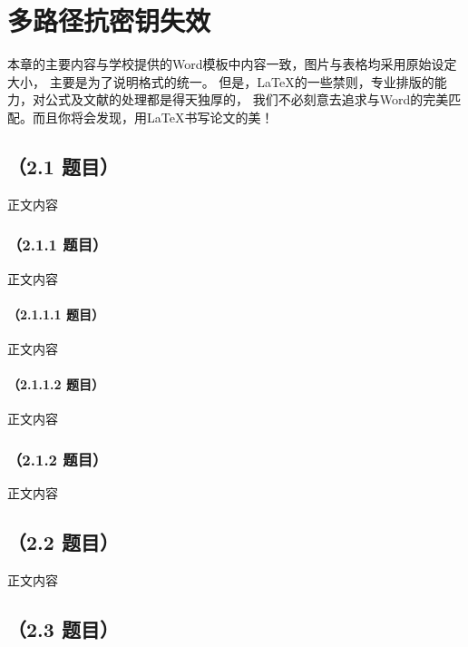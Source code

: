 \chapter{多路径抗密钥失效}

本章的主要内容与学校提供的Word模板中内容一致，图片与表格均采用原始设定大小，%
主要是为了说明格式的统一。%
但是，\LaTeX{}的一些禁则，专业排版的能力，对公式及文献的处理都是得天独厚的，%
我们不必刻意去追求与Word的完美匹配。而且你将会发现，用\LaTeX{}书写论文的美！ %

\section{（2.1 题目）}
正文内容

\subsection{（2.1.1 题目）}
正文内容

\subsubsection{（2.1.1.1 题目）}
正文内容

\subsubsection{（2.1.1.2 题目）}
正文内容

\subsection{（2.1.2 题目）}
正文内容


\section{（2.2 题目）}
正文内容

\section{（2.3 题目）}



